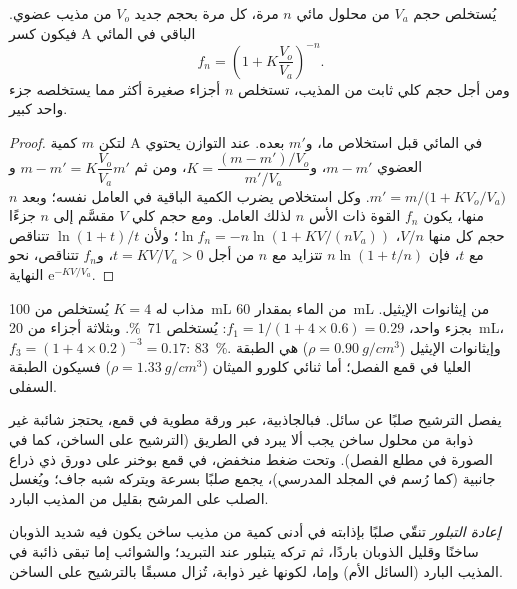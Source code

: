 \begin{proposition}\label{prop:b1:lab-techniques-1:multiple-extractions}
يُستخلص حجم $V_a$ من محلول مائي $n$ مرة، كل مرة بحجم
جديد $V_o$ من مذيب عضوي. فيكون كسر A الباقي في
 المائي
\[
  f_n = \left(1 + K \frac{V_o}{V_a}\right)^{-n}.
\]
ومن أجل حجم كلي ثابت من المذيب، تستخلص $n$ أجزاء صغيرة أكثر مما يستخلصه
جزء واحد كبير.
\end{proposition}
\begin{proof}
لتكن $m$ كمية A في  المائي قبل استخلاص ما،
و$m'$ بعده. عند التوازن يحتوي  العضوي $m - m'$،
و$K = \dfrac{(m - m')/V_o}{m'/V_a}$، ومن ثم $m - m' = K\dfrac{V_o}{V_a} m'$
و$m' = m\big/\bigl(1 + K V_o/V_a\bigr)$. وكل استخلاص يضرب
الكمية الباقية في العامل نفسه؛ وبعد $n$ منها، يكون $f_n$ القوة
ذات الأس $n$ لذلك العامل. ومع حجم كلي $V$ مقسَّم إلى $n$ جزءًا حجم كل منها $V/n$،
$\ln f_n = -n \ln(1 + KV/(nV_a))$؛ ولأن $\ln(1+t)/t$ تتناقص مع $t$،
فإن $n \ln(1 + t/n)$ تتزايد مع $n$ من أجل $t = KV/V_a > 0$، و$f_n$
تتناقص، نحو النهاية $\mathrm{e}^{-KV/V_a}$.
\end{proof}

\begin{example}
مذاب له $K = 4$ يُستخلص من \qty{100}{mL} من الماء بمقدار
\qty{60}{mL} من إيثانوات الإيثيل. بجزء واحد،
$f_1 = 1/(1 + 4 \times 0.6) = 0.29$: يُستخلص \qty{71}{\percent}.
وبثلاثة أجزاء من \qty{20}{mL}، $f_3 = (1 + 4 \times 0.2)^{-3} = 0.17$:
\qty{83}{\percent}. وإيثانوات الإيثيل ($\rho = \qty{0.90}{g/cm^3}$) هي
الطبقة العليا في قمع الفصل؛ أما ثنائي كلورو الميثان
($\rho = \qty{1.33}{g/cm^3}$) فسيكون الطبقة السفلى.
\end{example}

يفصل الترشيح صلبًا عن سائل. فبالجاذبية، عبر ورقة
مطوية في قمع، يحتجز شائبة غير ذوابة من محلول ساخن
يجب ألا يبرد في الطريق (الترشيح على الساخن، كما في الصورة في
مطلع الفصل). وتحت ضغط منخفض، في قمع بوخنر على
دورق ذي ذراع جانبية (كما رُسم في المجلد المدرسي)، يجمع صلبًا
بسرعة ويتركه شبه جاف؛ ويُغسل الصلب على المرشح بقليل
من المذيب البارد.

\begin{definition}\label{def:b1:lab-techniques-1:recrystallisation}
\emph{إعادة التبلور} تنقّي صلبًا
بإذابته في أدنى كمية من مذيب ساخن يكون فيه شديد الذوبان
ساخنًا وقليل الذوبان باردًا، ثم تركه يتبلور عند التبريد؛
والشوائب إما تبقى ذائبة في المذيب البارد (السائل الأم)
وإما، لكونها غير ذوابة، تُزال مسبقًا بالترشيح على الساخن.
\end{definition}

